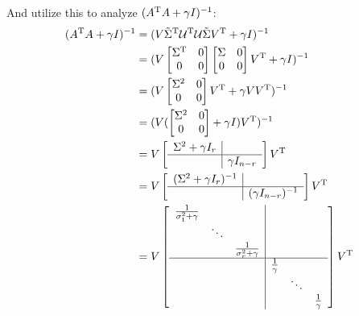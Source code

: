 And utilize this to analyze $(A^{{\rm T}}A + \gamma I)^{-1}$:
\begin{align*}
(A^{{\rm T}}A + \gamma I)^{-1} 
&= (V\tilde{\Sigma}^{{\rm T}}\mathcal{U}^{{\rm T}}\mathcal{U}\tilde{\Sigma}V^{{\rm T}} + \gamma I)^{-1}\\
&= (V
\begin{bmatrix}
\Sigma^{{\rm T}} & 0\\
0 & 0\\
\end{bmatrix}
\begin{bmatrix}
\Sigma & 0\\
0 & 0\\
\end{bmatrix}
V^{{\rm T}} + \gamma I)^{-1}\\
&=(V
\begin{bmatrix}
\Sigma^2 & 0\\
0  & 0
\end{bmatrix}
V^{{\rm T}} + \gamma VV^{{\rm T}}
)^{-1}\\
&= (V(
\begin{bmatrix}
\Sigma^2 & 0\\
0 & 0
\end{bmatrix}
+\gamma I)V^{{\rm T}})^{-1}\\
&= V
\left[
\begin{array}{c|c}
\Sigma^2+\gamma I_r&  \\ \hline 
& \gamma I_{n-r}
\end{array}
\right]
V^{{\rm T}}\\
&=
V
\left[
\begin{array}{c|c}
(\Sigma^2+\gamma I_r)^{-1}&  \\ \hline 
& ( \gamma I_{n-r})^{-1}
\end{array}
\right]
V^{{\rm T}}\\
&=
V
\left[
\begin{array}{c|c}
\begin{matrix}
\frac{1}{\sigma_1^2+\gamma} & &\\
&\ddots&\\
&&\frac{1}{\sigma_r^2+\gamma}
\end{matrix}&  \\ \hline 
& \begin{matrix}
\frac{1}{\gamma} & &\\
&\ddots&\\
&&\frac{1}{\gamma}
\end{matrix}
\end{array}
\right]
V^{{\rm T}}
\end{align*}

